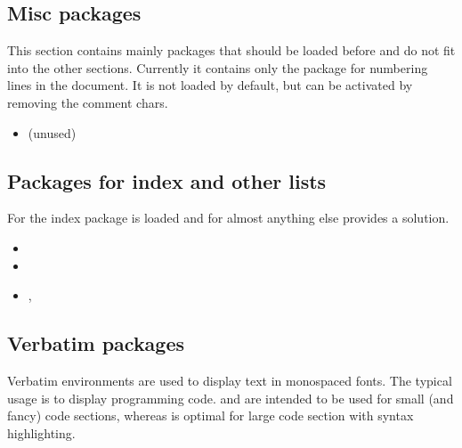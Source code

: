 
\subsection{Misc packages}
\label{sec:packages:misc}
This section contains mainly packages that should be loaded before  and do not fit into the other sections.
Currently it contains only the package  for numbering lines
in the document. It is not loaded by default, but can be activated by removing the comment chars.

\begin{itemize}[noitemsep]
\item {} (unused)
\end{itemize}


\subsection{Packages for index and other lists}
For the index package  is loaded and for almost anything else  provides a solution.

\begin{itemize}[noitemsep]
\item {}
\item {}
\item {}, 
\end{itemize}


\subsection{Verbatim packages}

Verbatim environments are used to display text in monospaced fonts. The typical usage is to display programming code.  and  are intended to be used for small (and fancy) code sections, whereas  is optimal for large code section with syntax highlighting.

